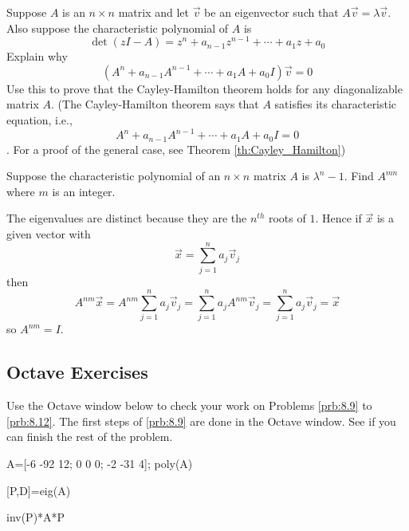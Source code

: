 \documentclass{ximera}
\begin{document}
\begin{problem}\label{prb:8.26} Suppose $A$ is an $n\times n$ matrix and let $\vec{v}$ be an
eigenvector such that $A\vec{v}=\lambda \vec{v}$. Also suppose the
characteristic polynomial of $A$ is
\begin{equation*}
\det \left( z I-A\right) =z ^{n}+a_{n-1} z ^{n-1}+\cdots
+a_{1}z +a_{0}
\end{equation*}
Explain why
\begin{equation*}
\left( A^{n}+a_{n-1}A^{n-1}+\cdots +a_{1}A+a_{0}I\right) \vec{v}=0
\end{equation*}
Use this to prove that the Cayley-Hamilton
theorem holds for any diagonalizable matrix $A$. (The Cayley-Hamilton theorem says that $A$ satisfies its
characteristic equation, i.e.,
\begin{equation*}
A^{n}+a_{n-1}A^{n-1}+\cdots +a_{1}A+a_{0}I=0
\end{equation*}.  For a proof of the general case, see Theorem \ref{th:Cayley_Hamilton})
\end{problem}

\begin{problem}\label{prb:8.27} Suppose the characteristic polynomial of an $n\times n$ matrix $A$ is
$\lambda^{n}-1$. Find $A^{mn}$ where $m$ is an integer.
\begin{hint}
The eigenvalues are distinct because
they are the $n^{th}$ roots of $1$. Hence if $\vec{x}$ is a given vector with
\[
\vec{x}=\sum_{j=1}^{n}a_{j}\vec{v}_{j}
\]
then
\[
A^{nm}\vec{x}=A^{nm}\sum_{j=1}^{n}a_{j}\vec{v}_{j}=
\sum_{j=1}^{n}a_{j}A^{nm}\vec{v}_{j}=\sum_{j=1}^{n}a_{j}\vec{v}_{j}=\vec{x}
\]
so $A^{nm}=I$.
\end{hint}
\end{problem}

\subsection*{Octave Exercises}
\begin{problem}\label{oct:char_poly}
Use the Octave window below to check your work on Problems \ref{prb:8.9} to \ref{prb:8.12}.  The first steps of \ref{prb:8.9} are done in the Octave window.  See if you can finish the rest of the problem.

A=[-6 -92 12; 0 0 0; -2 -31 4];
poly(A)


[P,D]=eig(A)

inv(P)*A*P

\end{problem}
\end{document}
